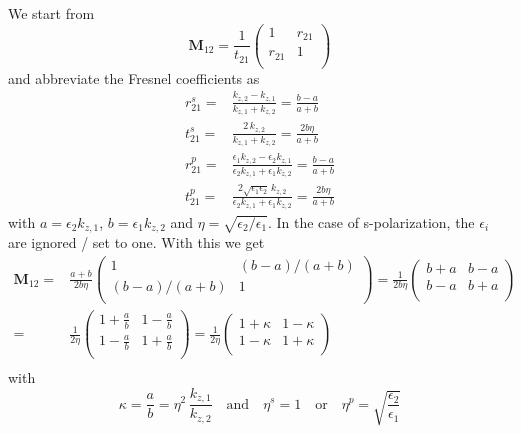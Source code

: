 We start from 
\begin{equation}
\mathbf{M}_{12} = \frac{1}{t_{21}} 
\begin{pmatrix}
1 & r_{21} \\ r_{21} & 1 \\
\end{pmatrix}
\end{equation}
and abbreviate the Fresnel coefficients as
\begin{align}
  r_{21}^s = & \frac{k_{z,2} - k_{z,1}}{k_{z,1} + k_{z,2}}  = \frac{b - a}{a + b} \\
 t_{21}^s = & \frac{2 \, k_{z,2}}{k_{z,1} + k_{z,2}} =   \frac{2 b \eta }{a + b}   \\
  r_{21}^p = & \frac{\epsilon_1	 k_{z,2} - \epsilon_2 k_{z,1}}
				  {\epsilon_2 k_{z,1} + \epsilon_1 k_{z,2}}  =   \frac{b - a}{a + b}\\
  t_{21}^p = & \frac{2 \sqrt{\epsilon_1 \epsilon_2}	 \,k_{z,2} }
				  {\epsilon_2 k_{z,1} + \epsilon_1 k_{z,2}}  =   \frac{2 b  \eta }{a + b} 
\end{align}
with $a = \epsilon_2 k_{z,1}$, $b =     \epsilon_1 k_{z,2}$ and $\eta = \sqrt{\epsilon_2 / \epsilon_1}$. In the case of s-polarization, the $\epsilon_i$ are ignored / set to one. With this we get
\begin{align}
\mathbf{M}_{12} = & \frac{a+b}{2 b \eta} 
\begin{pmatrix}
1 & (b-a)/(a+b) \\  (b-a)/(a+b) & 1 \\
\end{pmatrix}
= 
 \frac{1}{2 b \eta} 
\begin{pmatrix}
b+a & b-a \\  b-a & b+a \\
\end{pmatrix} \\
= &
 \frac{1}{2  \eta} 
\begin{pmatrix}
1+\frac{a}{b} & 1- \frac{a}{b} \\  1- \frac{a}{b} & 1+\frac{a}{b} \\
\end{pmatrix}
= 
 \frac{1}{2  \eta} 
\begin{pmatrix}
1+\kappa & 1- \kappa \\  1- \kappa & 1+\kappa \\
\end{pmatrix} \\
\end{align}
with 
\begin{equation}
\kappa = \frac{a}{b} = \eta^2 \,
\frac{  k_{z,1} }{ k_{z,2}}
\quad
\text{and}
\quad
\eta^s = 1 \quad \text{or} \quad \eta^p = \sqrt{ \frac{\epsilon_2}{\epsilon_1} }
\end{equation}




\printbibliography[segment=\therefsegment,heading=subbibliography]



